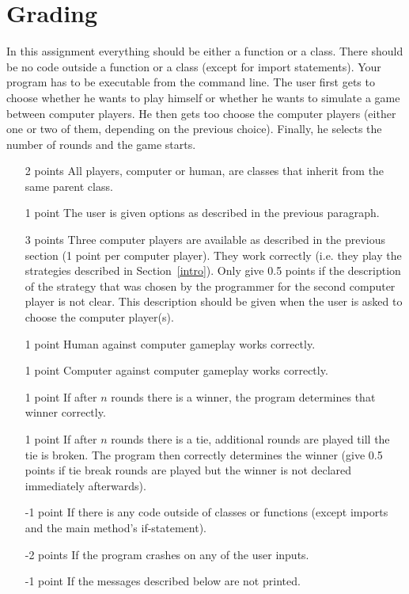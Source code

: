 \documentclass[11pt, leqno, a4paper]{article}
\begin{document}
\section{Grading}
In this assignment everything should be either a function or a class. There should be no code outside a function or a class (except for import statements). Your
program has to be executable from the command line. The user first gets to choose whether he wants to play himself or whether he wants to simulate a game between
computer players. He then gets too choose the computer players (either one or two of them, depending on the previous choice). Finally, he selects the number of
rounds and the game starts.
\begin{itemize}
\item[2 points]	All players, computer or human, are classes that inherit from the same parent class.
\item[1 point]	The user is given options as described in the previous paragraph.
\item[3 points]	Three computer players are available as described in the previous section (1 point per computer player). They work correctly 
				(i.e. they play the strategies described in Section~\ref{intro}). Only give 0.5 points
				if the description of the strategy that was chosen by the programmer for the second computer player is not clear. This description should be given
				when the user is asked to choose the computer player(s).
\item[1 point]	Human against computer gameplay works correctly.
\item[1 point]	Computer against computer gameplay works correctly.
\item[1 point]	If after $ n $ rounds there is a winner, the program determines that winner correctly.
\item[1 point]	If after $ n $ rounds there is a tie, additional rounds are played till the tie is broken. The program then correctly determines the winner (give 0.5 
				points if tie break rounds are played but the winner is not declared immediately afterwards).
\item[-1 point]	If there is any code outside of classes or functions (except imports and the main method's if-statement).
\item[-2 points]	If the program crashes on any of the user inputs.
\item[-1 point]	If the messages described below are not printed.
\end{itemize}
\end{document}
